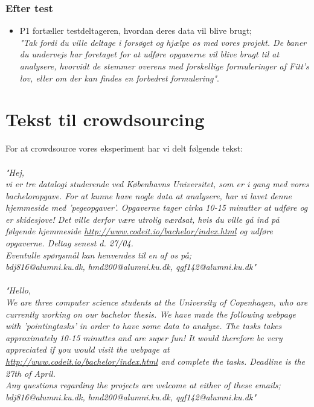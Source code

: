 \begin{appendices}
\subsection*{Efter test}
\begin{itemize}
\item{P1 fortæller testdeltageren, hvordan  deres data vil blive brugt;
\\\textit{"Tak fordi du ville deltage i forsøget og hjælpe os med vores projekt. De baner du undervejs har foretaget for at udføre opgaverne vil blive brugt til at analysere, hvorvidt de stemmer overens med forskellige formuleringer af Fitt's lov, eller om der kan findes en forbedret formulering"}.}
\end{itemize}

\chapter{Tekst til crowdsourcing}
\label{sec:crowdsource-text}
For at crowdsource vores eksperiment har vi delt følgende tekst:
\\\\\textit{"Hej,\\ vi er tre datalogi studerende ved Københavns Universitet, som er i gang med vores bacheloropgave. For at kunne have nogle data at analysere, har vi lavet denne hjemmeside med 'pegeopgaver'. Opgaverne tager cirka 10-15 minutter at udføre og er skidesjove! Det ville derfor være utrolig værdsat, hvis du ville gå ind på følgende hjemmeside \url{http://www.codeit.io/bachelor/index.html} og udføre opgaverne. Deltag senest d. 27/04.
\\Eventulle spørgsmål kan henvendes til en af os på;\\bdj816@alumni.ku.dk, hmd200@alumni.ku.dk, qgf142@alumni.ku.dk"}
\\\\\textit{"Hello,\\ We are three computer science students at the University of Copenhagen, who are currently working on our bachelor thesis. We have made the following webpage with 'pointingtasks' in order to have some data to analyze. The tasks takes approximately 10-15 minuttes and are super fun! It would therefore be very appreciated if you would visit the webpage at \url{http://www.codeit.io/bachelor/index.html} and complete the tasks. Deadline is the 27th of April.
\\Any questions regarding the projects are welcome at either of these emails;\\bdj816@alumni.ku.dk, hmd200@alumni.ku.dk, qgf142@alumni.ku.dk"}


\end{appendices}
